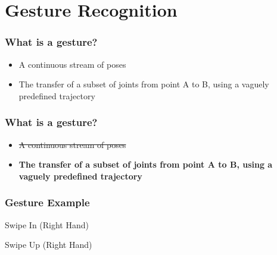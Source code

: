 \section{Gesture Recognition}

\begin{frame}
\frametitle{What is a gesture?}

\begin{itemize}
\item A continuous stream of poses
\item The transfer of a subset of joints from point A to B, using a vaguely predefined trajectory
\end{itemize}
\end{frame}

\begin{frame}
\frametitle{What is a gesture?}
\begin{itemize}
\item \st{A continuous stream of poses}
\item \textbf{The transfer of a subset of joints from point A to B, using a vaguely predefined trajectory}
\end{itemize}

\end{frame}

\begin{frame}
\frametitle{Gesture Example}

\begin{center}
Swipe In (Right Hand)

\begin{figure}[!htb]
\centering
{}
\end{figure}


\end{center}

\begin{center}
Swipe Up (Right Hand)

\begin{figure}[!htb]
\centering
{}
\end{figure}


\end{center}
\end{frame}



